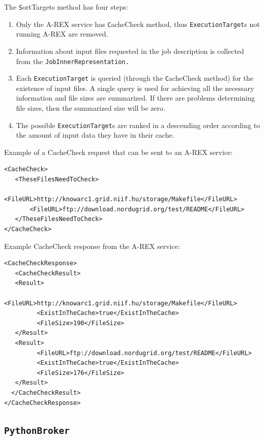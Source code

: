 \documentclass{book}
\newcommand{\PythonBroker}{\texttt{PythonBroker}}
\newcommand{\ExecutionTarget}{\texttt{ExecutionTarget}}
\begin{document}
The {\texttt SortTargets} method has four steps:

\begin{enumerate}
\item{Only the A-REX service has {\texttt CacheCheck} method, thus
  {\ExecutionTarget}s not running A-REX are removed.}
\item{Information about input files requested in the job description
  is collected from the \texttt{JobInnerRepresentation.}}
\item{Each {\ExecutionTarget} is queried (through the {\texttt
    CacheCheck} method) for the existence of input files.  A single
  query is used for achieving all the necessary information and file
  sizes are summarized. If there are problems determining file sizes,
  then the summarized size will be zero.}
\item{The possible {\ExecutionTarget}s are ranked in a descending
  order according to the amount of input data they have in their
  cache.}
\end{enumerate}

Example of a CacheCheck request that can be sent to an A-REX service:

\begin{shaded}
\begin{verbatim}
<CacheCheck>
   <TheseFilesNeedToCheck>
       <FileURL>http://knowarc1.grid.niif.hu/storage/Makefile</FileURL>
       <FileURL>ftp://download.nordugrid.org/test/README</FileURL>
   </TheseFilesNeedToCheck>
</CacheCheck>
\end{verbatim}
\end{shaded}

Example CacheCheck response from the A-REX service:

\begin{shaded}
\begin{verbatim}
<CacheCheckResponse>
   <CacheCheckResult>
   <Result>
         <FileURL>http://knowarc1.grid.niif.hu/storage/Makefile</FileURL>
         <ExistInTheCache>true</ExistInTheCache>
         <FileSize>190</FileSize>
   </Result>
   <Result>
         <FileURL>ftp://download.nordugrid.org/test/README</FileURL>
         <ExistInTheCache>true</ExistInTheCache>
         <FileSize>176</FileSize>
   </Result>
  </CacheCheckResult>
</CacheCheckResponse>
\end{verbatim}
\end{shaded}

\subsection{\PythonBroker}
\end{document}
